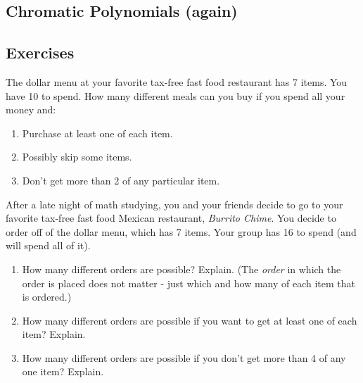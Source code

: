 \documentclass[10pt,]{book}
\theoremstyle{plain}
\theoremstyle{definition}
\theoremstyle{definition}
\theoremstyle{definition}
\theoremstyle{definition}
\numberwithin{equation}{chapter}
\begin{document}
\subsection[{Chromatic Polynomials (again)}]{Chromatic Polynomials (again)}\label{subsection-23}
\typeout{************************************************}
\typeout{************************************************}
\subsection*{Exercises}\label{exercises_counting-advPIE}
\begin{divisionexercise}{1}\hypertarget{exercise-70}{}
\hypertarget{p-1026}{}%
The dollar menu at your favorite tax-free fast food restaurant has 7 items. You have \textdollar{}10 to spend. How many different meals can you buy if you spend all your money and: \leavevmode%
\begin{enumerate}[label=(\alph*)]
\item\hypertarget{li-148}{}\hypertarget{p-1027}{}%
Purchase at least one of each item.%
\item\hypertarget{li-149}{}\hypertarget{p-1028}{}%
Possibly skip some items.%
\item\hypertarget{li-150}{}\hypertarget{p-1029}{}%
Don't get more than 2 of any particular item.%
\end{enumerate}
%
\end{divisionexercise}%
\begin{divisionexercise}{2}\hypertarget{exercise-71}{}
\hypertarget{p-1031}{}%
After a late night of math studying, you and your friends decide to go to your favorite tax-free fast food Mexican restaurant, \emph{Burrito Chime}. You decide to order off of the dollar menu, which has 7 items. Your group has \textdollar{}16 to spend (and will spend all of it). \leavevmode%
\begin{enumerate}[label=(\alph*)]
\item\hypertarget{li-154}{}\hypertarget{p-1032}{}%
How many different orders are possible? Explain. (The \emph{order} in which the order is placed does not matter - just which and how many of each item that is ordered.) %
\item\hypertarget{li-155}{}\hypertarget{p-1033}{}%
How many different orders are possible if you want to get at least one of each item? Explain. %
\item\hypertarget{li-156}{}\hypertarget{p-1034}{}%
How many different orders are possible if you don't get more than 4 of any one item? Explain. %
\end{enumerate}
%
\end{divisionexercise}%
\end{document}
